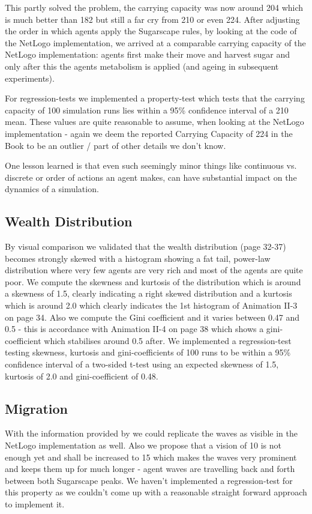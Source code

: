 This partly solved the problem, the carrying capacity was now around 204 which is much better than 182 but still a far cry from 210 or even 224. After adjusting the order in which agents apply the Sugarscape rules, by looking at the code of the NetLogo implementation, we arrived at a comparable carrying capacity of the NetLogo implementation: agents first make their move and harvest sugar and only after this the agents metabolism is applied (and ageing in subsequent experiments).

For regression-tests we implemented a property-test which tests that the carrying capacity of 100 simulation runs lies within a 95\% confidence interval of a 210 mean. These values are quite reasonable to assume, when looking at the NetLogo implementation - again we deem the reported Carrying Capacity of 224 in the Book to be an outlier / part of other details we don't know.

One lesson learned is that even such seemingly minor things like continuous vs. discrete or order of actions an agent makes, can have substantial impact on the dynamics of a simulation.

\subsection{Wealth Distribution}
By visual comparison we validated that the wealth distribution (page 32-37) becomes strongly skewed with a histogram showing a fat tail, power-law distribution where very few agents are very rich and most of the agents are quite poor. We compute the skewness and kurtosis of the distribution which is around a skewness of 1.5, clearly indicating a right skewed distribution and a kurtosis which is around 2.0 which clearly indicates the 1st histogram of Animation II-3 on page 34. Also we compute the Gini coefficient and it varies between 0.47 and 0.5 - this is accordance with Animation II-4 on page 38 which shows a gini-coefficient which stabilises around 0.5 after. 
We implemented a regression-test testing skewness, kurtosis and gini-coefficients of 100 runs to be within a 95\% confidence interval of a two-sided t-test using an expected skewness of 1.5, kurtosis of 2.0 and gini-coefficient of 0.48.

\subsection{Migration}
With the information provided by \cite{weaver_replicating_2009} we could replicate the waves as visible in the NetLogo implementation as well. Also we propose that a vision of 10 is not enough yet and shall be increased to 15 which makes the waves very prominent and keeps them up for much longer - agent waves are travelling back and forth between both Sugarscape peaks. We haven't implemented a regression-test for this property as we couldn't come up with a reasonable straight forward approach to implement it.

